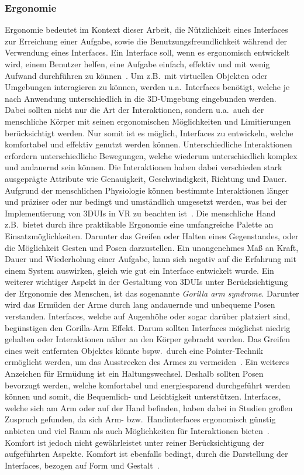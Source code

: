 \subsubsection{Ergonomie}
Ergonomie bedeutet im Kontext dieser Arbeit, die Nützlichkeit eines Interfaces zur Erreichung einer Aufgabe, sowie die Benutzungsfreundlichkeit während der Verwendung eines Interfaces. Ein Interface soll, wenn es ergonomisch entwickelt wird, einem Benutzer helfen, eine Aufgabe einfach, effektiv und mit wenig Aufwand durchführen zu können~\citep{ergonomics}. Um z.B.~mit virtuellen Objekten oder Umgebungen interagieren zu können, werden u.a.~Interfaces benötigt, welche je nach Anwendung unterschiedlich in die 3D-Umgebung eingebunden werden. Dabei sollten nicht nur die Art der Interaktionen, sondern u.a.~auch der menschliche Körper mit seinen ergonomischen Möglichkeiten und Limitierungen berücksichtigt werden.
Nur somit ist es möglich, Interfaces zu entwickeln, welche komfortabel und effektiv genutzt werden können. Unterschiedliche Interaktionen erfordern unterschiedliche Bewegungen, welche wiederum unterschiedlich komplex und andauernd sein können. Die Interaktionen haben dabei verschieden stark ausgeprägte Attribute wie Genauigkeit, Geschwindigkeit, Richtung und Dauer. Aufgrund der menschlichen Physiologie können bestimmte Interaktionen län\-ger und präziser oder nur bedingt und umständlich umgesetzt werden, was bei der Implementierung von 3DUIs in VR zu beachten ist~\cite{theoryandpracticebook}. Die menschliche Hand z.B.~bietet durch ihre praktikable Ergonomie eine umfangreiche Palette an Einsatzmöglichkeiten. Darunter das Greifen oder Halten eines Gegenstandes, oder die Möglichkeit Gesten und Posen darzustellen. Ein unangenehmes Maß an Kraft, Dauer und Wiederholung einer Aufgabe, kann sich negativ auf die Erfahrung mit einem System auswirken, gleich wie gut ein Interface entwickelt wurde. Ein weiterer wichtiger Aspekt in der Gestaltung von 3DUIs unter Berücksichtigung der Ergonomie des Menschen, ist das sogenannte \textit{Gorilla arm syndrome}. Darunter wird das Ermüden der Arme durch lang andauernde und unbequeme Posen verstanden. Interfaces, welche auf Augenhöhe oder sogar darüber platziert sind, begünstigen den Gorilla-Arm Effekt. Darum sollten Interfaces möglichst niedrig gehalten oder Interaktionen näher an den Körper gebracht werden. Das Greifen eines weit entfernten Objektes könnte bspw.~durch eine Pointer-Technik ermöglicht werden, um das Ausstrecken des Armes zu vermeiden~\cite{theoryandpracticebook,consumedindurance}. Ein weiteres Anzeichen für Ermüdung ist ein Haltungswechsel. Deshalb sollten Posen bevorzugt werden, welche komfortabel und energiesparend durchgeführt werden können und somit, die Bequemlich- und Leichtigkeit unterstützen. Interfaces, welche sich am Arm oder auf der Hand befinden, haben dabei in Studien großen Zuspruch gefunden, da sich Arm- bzw.~Handinterfaces ergonomisch günstig anbieten und viel Raum als auch Möglichkeiten für Interaktionen bieten~\cite{implicationsoflocation}.
Komfort ist jedoch nicht gewährleistet unter reiner Berücksichtigung der aufgeführten Aspekte. Komfort ist ebenfalls bedingt, durch die Darstellung der Interfaces, bezogen auf Form und Gestalt~\cite{theoryandpracticebook}.

